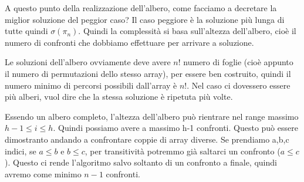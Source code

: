 A questo punto della realizzazione dell'albero, come facciamo a decretare la miglior soluzione del peggior caso? Il caso peggiore è la soluzione più lunga di tutte quindi $\sigma(\pi_n)$. Quindi la complessità si basa sull'altezza dell'albero, cioè il numero di confronti  che dobbiamo effettuare per arrivare a soluzione.\smallskip

Le soluzioni dell'albero ovviamente deve avere $n!$ numero di foglie (cioè appunto il numero di permutazioni dello stesso array), per essere ben costruito, quindi il numero minimo di percorsi possibili dall'array è $n!$. Nel caso ci dovessero essere più alberi, vuol dire che la stessa soluzione è ripetuta più volte.\smallskip

Essendo un albero completo, l'altezza dell'albero può rientrare nel range massimo $h-1 \le i \le h$. Quindi possiamo avere a massimo h-1 confronti. Questo può essere dimostranto andando a confrontare coppie di array diverse. Se prendiamo a,b,c indici, se $a \le b $ e $b \le c$, per transitività potremmo già saltarci un confronto ($a \le c$). Questo ci rende l'algoritmo salvo soltanto di un confronto a finale, quindi avremo come minimo $n-1$ confronti.